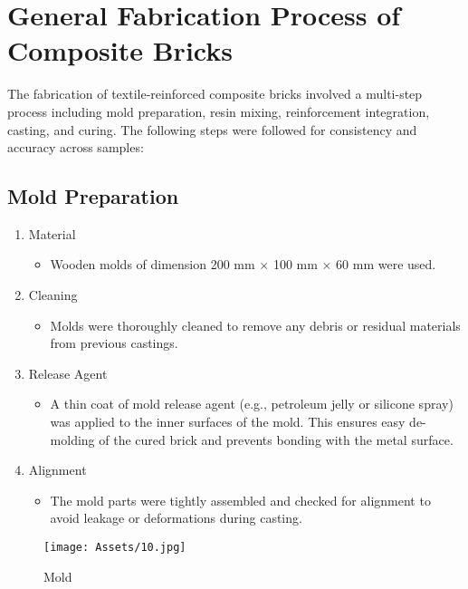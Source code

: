 \section{General Fabrication Process of Composite Bricks }
The fabrication of textile-reinforced composite bricks involved a multi-step process including mold preparation, resin mixing, reinforcement integration, casting, and curing. The following steps were followed for consistency and accuracy across samples: 

\subsection{Mold Preparation}
\begin{enumerate}
    \item  Material
    \begin{itemize}
        \item Wooden molds of dimension 200 mm × 100 mm × 60 mm were used. 
    \end{itemize}
    \item Cleaning
    \begin{itemize}
        \item Molds were thoroughly cleaned to remove any debris or residual materials from previous castings.  
    \end{itemize}
    \item  Release Agent 
    \begin{itemize}
        \item A thin coat of mold release agent (e.g., petroleum jelly or silicone spray) was applied to the inner surfaces of the mold. This ensures easy de-molding of the cured brick and prevents bonding with the metal surface. 
    \end{itemize}
    \item  Alignment 
    \begin{itemize}
        \item The mold parts were tightly assembled and checked for alignment to avoid leakage or deformations during casting.
    \end{itemize}
\end{enumerate}

\begin{figure}[H]
    \centering
    \texttt{[image: Assets/10.jpg]}
    \caption{Mold}
    \label{fig:placeholder}
\end{figure}

